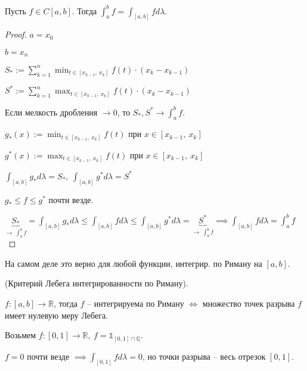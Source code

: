\begin{theorem}
    Пусть $f \in C[a, b]$. Тогда $\int_a^b {f} = \int_{[a, b]}{f d \lambda}$.
\end{theorem}
\begin{proof}
    $a = x_0$

    $b = x_n$

    $S_* := \sum_{k=1}^{n} \min_{t \in [x_{k-1}, \ x_k]} {f(t) \cdot (x_k - x_{k-1})}$

    $S^* := \sum_{k=1}^{n} \max_{t \in [x_{k-1}, \ x_k]} {f(t) \cdot (x_k - x_{k-1})}$


    Если мелкость дробления $\rightarrow 0$, то $S_*, S^* \rightarrow \int_a^b {f}$.

    $g_*(x) := \min_{t \in [x_{k - 1}, \ x_k]}{f(t)}$ при $x \in [x_{k - 1}, \ x_k]$

    $g^*(x) := \max_{t \in [x_{k - 1}, \ x_k]}{f(t)}$ при $x \in [x_{k - 1}, \ x_k]$

    $\int_{[a, b]}{g_* d \lambda} = S_*, \ \int_{[a, b]}{g^* d \lambda} = S^*$

    $g_* \leq f \leq g^*$ почти везде.

    $\underbrace{S_*}_{\rightarrow \ \int_a^b f} = \int_{[a, b]}{g_* d \lambda} \leq \int_{[a, b]}{f d \lambda} \leq \int_{[a, b]}{g^* d \lambda} = \underbrace{S^*}_{\rightarrow \ \int_a^b{f}} \implies \int_{[a, b]}{f d \lambda} = \int_a^b {f}$
\end{proof}
\begin{remark}
    На самом деле это верно для любой функции, интегрир. по Риману на $[a, b]$.
\end{remark}

\begin{theorem}
    (Критерий Лебега интегрированности по Риману).

    $f: [a, b] \rightarrow \mathbb{R}$, тогда $f$ -- интегрируема по Риману $\Leftrightarrow$ множество точек разрыва $f$ имеет нулевую меру Лебега.
\end{theorem}
\begin{example}
    Возьмем $f: [0, 1] \rightarrow \mathbb{R}, \ f = \mathbb{1}_{[0, 1] \cap \mathbb{Q}}$.

    $f = 0$ почти везде $\implies \int_{[0, 1]}{f d \lambda} = 0$, но точки разрыва -- весь отрезок $[0, 1]$.
\end{example}

